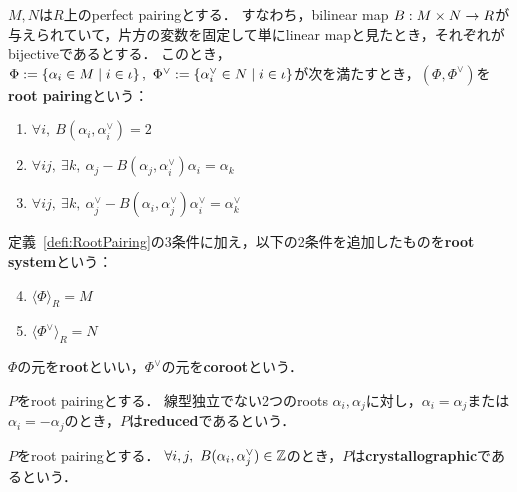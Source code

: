 \begin{definition}
  \label{defi:RootPairing}
  \leanok
  $M, N$は$R$上のperfect pairingとする．
  すなわち，bilinear map $B : M \times N \rightarrow R$が与えられていて，片方の変数を固定して単にlinear mapと見たとき，それぞれがbijectiveであるとする．
  このとき，$\Phi := \set{\alpha_i \in M}{i \in \iota},\ \Phi^\vee := \set{\alpha^\vee_i \in N}{i \in \iota}$が次を満たすとき，$(\Phi, \Phi^\vee)$を\textbf{root pairing}という：
  \begin{enumerate}[label=(\roman*)]
    \item $\forall i,\ B(\alpha_i, \alpha^\vee_i) = 2$ \label{defi:RootPairing_EqTwo}
    \item $\forall i j,\ \exists k,\ \alpha_j - B(\alpha_j, \alpha^\vee_i) \alpha_i = \alpha_k$
    \item $\forall i j,\ \exists k,\ \alpha^\vee_j - B(\alpha_i, \alpha^\vee_j) \alpha^\vee_i = \alpha^\vee_k$
  \end{enumerate}
\end{definition}

\begin{definition}
  \label{defi:RootSystem}
  \leanok
  定義~\ref{defi:RootPairing}の3条件に加え，以下の2条件を追加したものを\textbf{root system}という：
  \begin{enumerate}[label=(\roman*)]
    \setcounter{enumi}{3}
    \item $\langle \Phi \rangle_R = M$
    \item $\langle \Phi^\vee \rangle_R = N$
  \end{enumerate}
  $\Phi$の元を\textbf{root}といい，$\Phi^\vee$の元を\textbf{coroot}という．
\end{definition}

\begin{definition}
  \label{defi:RootPairing.IsReduced}
  \leanok
  $P$をroot pairingとする．
  線型独立でない2つのroots $\alpha_i, \alpha_j$に対し，$\alpha_i = \alpha_j$または$\alpha_i = -\alpha_j$のとき，$P$は\textbf{reduced}であるという．
\end{definition}

\begin{definition}
  \label{defi:RootPairing.IsCrystallographic}
  \leanok
  $P$をroot pairingとする．
  $\forall i, j,\ B(\alpha_i, \alpha^\vee_j) \in \mathbb{Z}$のとき，$P$は\textbf{crystallographic}であるという．
\end{definition}

